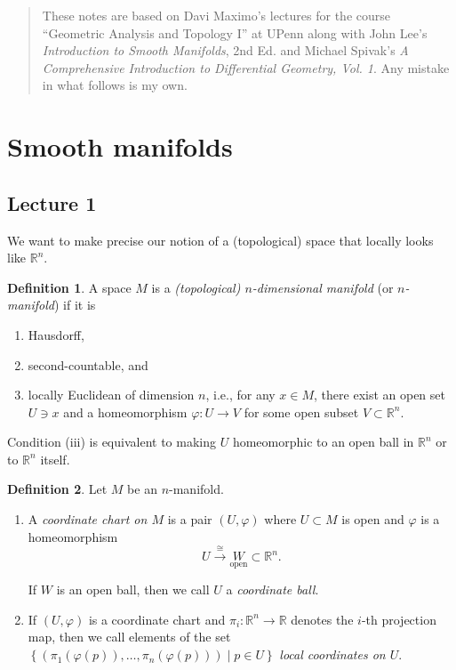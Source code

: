 \documentclass[10pt,letterpaper,cm]{nupset}
\theoremstyle{definition}
\newtheorem{definition}{Definition}[subsection]
\theoremstyle{theorem}
\theoremstyle{remark}
\newcommand{\R}{\mathbb R}
\newcommand{\1}{\mathbf{1}}
\newcommand{\0}{\vec 0}
\begin{document}
\thispagestyle{empty}
\begin{abstract}
These notes are based on Davi Maximo's lectures for the course ``Geometric Analysis and Topology I'' at UPenn along with John Lee's \textit{Introduction to Smooth Manifolds}, 2nd Ed. and Michael Spivak's \textit{A Comprehensive Introduction to Differential Geometry, Vol. 1}. Any mistake in what follows is my own.
\end{abstract}


\tableofcontents
\newpage

\section{Smooth manifolds}

\subsection{Lecture 1}

We want to make precise our notion of a (topological) space that locally looks like $\R^n$.

\theoremstyle{definition}
\begin{definition}{A space $M$ is a \textit{(topological) $n$-dimensional manifold} (or \textit{$n$-manifold}) if it is 
\begin{enumerate}[label=(\roman*)]
\item Hausdorff, 
\item second-countable, and 
\item locally Euclidean of dimension $n$, i.e., for any $x\in M$, there exist an open set $U\ni x$ and a homeomorphism $\varphi : U \to V$ for some open subset $V\subset \R^n$.
\end{enumerate}
}
\end{definition}

Condition (iii) is equivalent to making $U$ homeomorphic to an open ball in $\R^n$ or to $\R^n$ itself.

\begin{definition} Let $M$ be an $n$-manifold.
\begin{enumerate}
\item  A \textit{coordinate chart on $M$} is a pair $\left(U, \varphi\right)$ where $U\subset M$ is open and $\varphi$ is a homeomorphism $$U \overset{\cong}{\longrightarrow} \underset{\text{open}} W \subset \R^n.$$

If $W$ is an open ball, then we call $U$ a \textit{coordinate ball}.
\item If $\left(U, \varphi\right)$ is a coordinate chart and $\pi_i : \R^n \to \R$ denotes the $i$-th projection map, then we call elements of the set $\left\{\left(\pi_1(\varphi(p)), \ldots, \pi_n(\varphi(p))\right) \mid p \in U\right\}$ \textit{local coordinates on $U$}.
\end{enumerate}
\end{definition}
\end{document}

